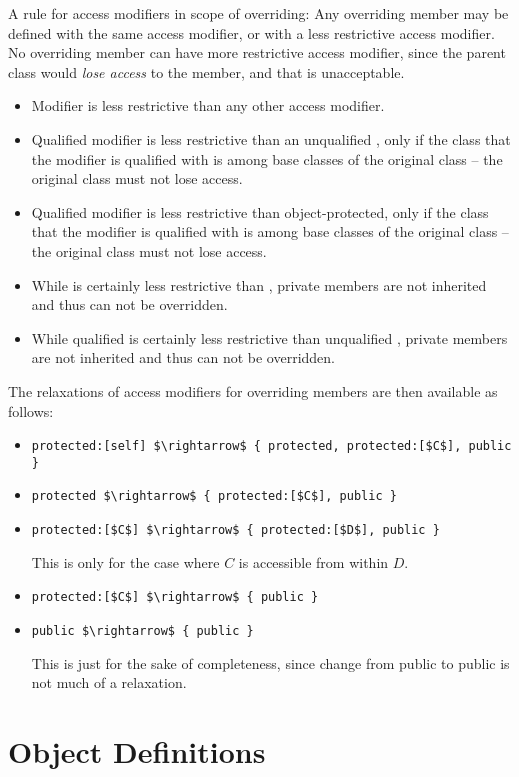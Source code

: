 A rule for access modifiers in scope of overriding: Any overriding member may be defined with the same access modifier, or with a less restrictive access modifier. No overriding member can have more restrictive access modifier, since the parent class would {\em lose access} to the member, and that is unacceptable. 
\begin{itemize}
\item Modifier  is less restrictive than any other access modifier. 
\item Qualified modifier  is less restrictive than an unqualified , only if the class that the modifier is qualified with is among base classes of the original class -- the original class must not lose access. 
\item Qualified modifier  is less restrictive than object-protected, only if the class that the modifier is qualified with is among base classes of the original class -- the original class must not lose access. 
\item While  is certainly less restrictive than , private members are not inherited and thus can not be overridden. 
\item While qualified  is certainly less restrictive than unqualified , private members are not inherited and thus can not be overridden. 
\end{itemize}
The relaxations of access modifiers for overriding members are then available as follows: 
\begin{itemize}
\item \lstinline!protected:[self] $\rightarrow$ { protected, protected:[$C$], public }!
\item \lstinline!protected $\rightarrow$ { protected:[$C$], public }!
\item \lstinline!protected:[$C$] $\rightarrow$ { protected:[$D$], public }!

This is only for the case where $C$ is accessible from within $D$. 
\item \lstinline!protected:[$C$] $\rightarrow$ { public }!
\item \lstinline!public $\rightarrow$ { public }!

This is just for the sake of completeness, since change from public to public is not much of a relaxation. 
\end{itemize}

\section{Object Definitions}
\label{sec:object-definitions}


